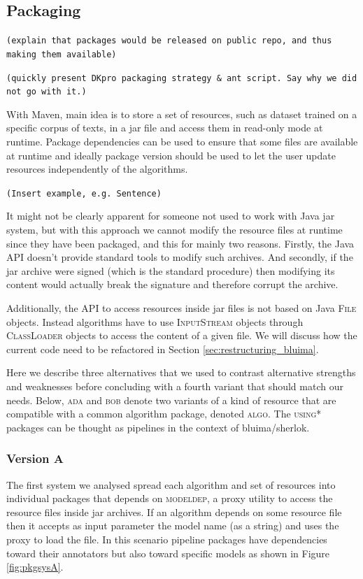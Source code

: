 \documentclass{article}
\newcommand{\ID}[1]{{\textsc{#1}}}
\newcommand{\TODO}[1]{\texttt{\textcolor{YellowOrange}{(#1)}}} %
\begin{document}
\subsection{Packaging}

\TODO{explain that packages would be released on public repo, and thus making them available}

\TODO{quickly present DKpro packaging strategy \& ant script. Say why we did not go with it.}

With Maven, main idea is to store a set of resources, such as dataset trained on a specific corpus of texts, in a jar file and access them in read-only mode at runtime. Package dependencies can be used to ensure that some files are available at runtime and ideally package version should be used to let the user update resources independently of the algorithms.

\TODO{Insert example, e.g. Sentence}

It might not be clearly apparent for someone not used to work with Java jar system, but with this approach we cannot modify the resource files at runtime since they have been packaged, and this for mainly two reasons. Firstly, the Java API doesn't provide standard tools to modify such archives. And secondly, if the jar archive were signed (which is the standard procedure) then modifying its content would actually break the signature and therefore corrupt the archive.

Additionally, the API to access resources inside jar files is not based on Java \ID{File} objects. Instead algorithms have to use \ID{InputStream} objects through \ID{ClassLoader} objects to access the content of a given file. We will discuss how the current code need to be refactored in Section \ref{sec:restructuring_bluima}.

Here we describe three alternatives that we used to contrast alternative strengths and weaknesses before concluding with a fourth variant that should match our needs. Below, \ID{ada} and \ID{bob} denote two variants of a kind of resource that are compatible with a common algorithm package, denoted \ID{algo}. The \ID{using*} packages can be thought as pipelines in the context of bluima/sherlok.

\subsubsection{Version A}

The first system we analysed spread each algorithm and set of resources into individual packages that depends on \ID{modeldep}, a proxy utility to access the resource files inside jar archives. If an algorithm depends on some resource file then it accepts as input parameter the model name (as a string) and uses the proxy to load the file. In this scenario pipeline packages have dependencies toward their annotators but also toward specific models as shown in Figure \ref{fig:pkgsysA}.
\end{document}
